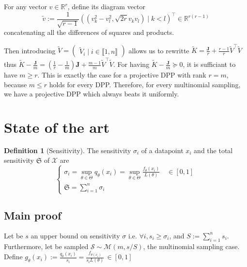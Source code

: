 \documentclass{article} %
\newcommand{\RR}{\mathbb{R}}
\newcommand{\T}{^\top}  %
\newcommand{\1}{\mathds{1}} %
\newcommand{\moones}{\boldsymbol{J}} %
\newcommand{\intint}[2]{\llbracket #1,#2 \rrbracket} %
\theoremstyle{definition} %
\newtheorem{definition}{Definition}[section]
\begin{document}
For any vector $v \in \RR^{r}$, \cite{copenhaver2013diagramvectors} define its diagram vector 
$$\tilde v :=
 \frac{1}{\sqrt{r-1}} ((v_k^{2}-v_l^{2} , \sqrt{2 r} v_k v_l ) \mid k<l)\T \in \RR^{r(r-1)}$$
concatenating all the differences of squares and products.

Then introducing $\tilde V = \begin{pmatrix}\tilde V_i \mid i\in\intint{1}{n}\end{pmatrix}
$ allows us to rewritte $\tilde K = \frac{\moones}{r} + \frac{r-1}{r} \tilde V\T \tilde V$ thus $\tilde K - \frac{\moones}{m} = (\frac{1}{r}-\frac{1}{m})\moones + \frac{m-1}{m} \tilde V\T \tilde V$. For having $\tilde K - \frac{\moones}{m}\succeq 0$, it is sufficiant to have $m \geq r$. This is exactly the case for a projective DPP with rank $r = m$, because $m \leq r$ holds for every DPP. Therefore, for every multinomial sampling, we have a projective DPP which always beats it uniformly.


\section{State of the art}
\begin{definition}[Sensitivity]
	The sensitivity $\sigma_i$ of a datapoint $x_{i}$ and the total sensitivity $\mathfrak S$ of $\mathcal X$ are
	$$
	\begin{cases}
		\sigma_{i}=\sup_{\theta \in \Theta} q_{\theta}(x_i) = \sup _{\theta \in \Theta} \frac{f_{\theta}\left(x_{i}\right)}{L(\theta)} \quad \in[0,1]\\
		\mathfrak{S}=\sum_{i=1}^{n} \sigma_{i}
	\end{cases}
	$$
\end{definition} 

\subsection{Main proof}
Let be $s$ an upper bound on sensitivity $\sigma$ i.e. $\forall i, s_i \geq \sigma_i$, and $S := \sum_{i=1}^n s_i$. Furthermore, let be sampled  $\mathcal S \sim \mathcal M(m, s/S)$, the multinomial sampling case. Define $g_\theta(x_i) := \frac{q_\theta(x_i)}{s_i} = \frac{f_{\theta(x_i)}}{s_i L(\theta)}  \, \in[0,1]$
\end{document}
